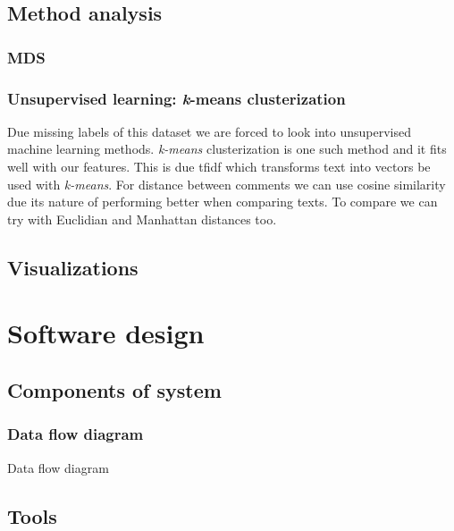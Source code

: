 \documentclass[a4paper,12pt]{article}
\begin{document}
 	\subsection{Method analysis}
	\subsubsection{MDS}
	\subsubsection{Unsupervised learning: {\textit k-means} clusterization }
    
    Due missing labels of this dataset we are forced to look into unsupervised machine learning methods. \textit{k-means} clusterization \cite{clusterization} is one such method and it fits well with our features. This is due \acrshort{tfidf} which transforms text into vectors be used with \textit{k-means}.
    For distance between comments we can use cosine similarity \cite{cosine_similarity} due its nature of performing better when comparing texts. To compare we can try with Euclidian and Manhattan distances too.
    \subsection{Visualizations}

    
    \clearpage
    
    \section{Software design}
    \subsection{Components of system}
  	\subsubsection{Data flow diagram}
		Data flow diagram
		
    
    \subsection{Tools}
\end{document}
